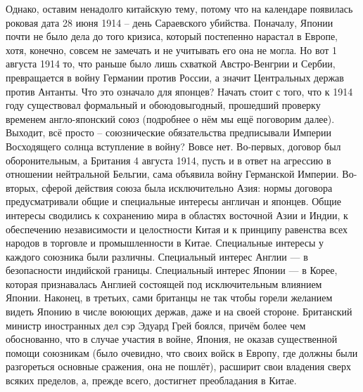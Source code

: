 Однако, оставим ненадолго китайскую тему, потому что на календаре появилась роковая дата 28 июня 1914 – день Сараевского убийства. Поначалу, Японии почти не было дела до того кризиса, который постепенно нарастал в Европе, хотя, конечно, совсем не замечать и не учитывать его она не могла. Но вот 1 августа 1914 то, что раньше было лишь схваткой Австро-Венгрии и Сербии, превращается в войну Германии против России, а значит Центральных держав против Антанты. Что это означало для японцев? Начать стоит с того, что к 1914 году существовал формальный и обоюдовыгодный, прошедший проверку временем англо-японский союз (подробнее о нём мы ещё поговорим далее). Выходит, всё просто – союзнические обязательства предписывали Империи Восходящего солнца вступление в войну? Вовсе нет. Во-первых, договор был оборонительным, а Британия 4 августа 1914, пусть и в ответ на агрессию в отношении нейтральной Бельгии, сама объявила войну Германской Империи. Во-вторых, сферой действия союза была исключительно Азия: нормы договора предусматривали общие и специальные интересы англичан и японцев. Общие интересы сводились к сохранению мира в областях восточной Азии и Индии, к обеспечению независимости и целостности Китая и к принципу равенства всех народов в торговле и промышленности в Китае. Специальные интересы у каждого союзника были различны. Специальный интерес Англии — в безопасности индийской границы. Специальный интерес Японии — в Корее, которая признавалась Англией состоящей под исключительным влиянием Японии. Наконец, в третьих, сами британцы не так чтобы горели желанием видеть Японию в числе воюющих держав, даже и на своей стороне. Британский министр иностранных дел сэр Эдуард Грей боялся, причём более чем обоснованно, что в случае участия в войне, Япония, не оказав существенной помощи союзникам (было очевидно, что своих войск в Европу, где должны были разгореться основные сражения, она не пошлёт), расширит свои владения сверх всяких пределов, а, прежде всего, достигнет преобладания в Китае. 

